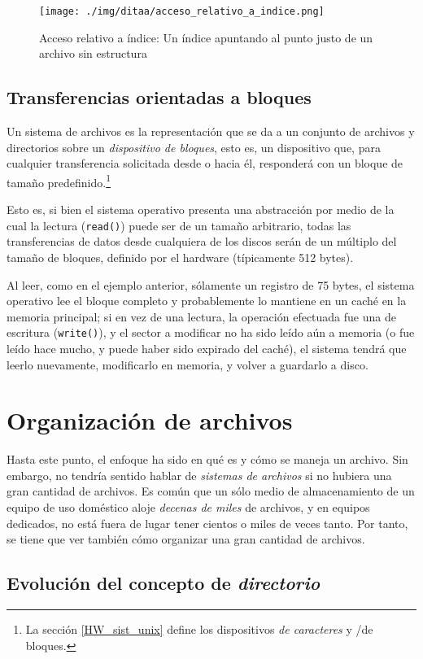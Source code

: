 \documentclass[11pt,fleqn]{book} %
\begin{document}
\begin{figure}[htb]
\centering
\texttt{[image: ./img/ditaa/acceso\_relativo\_a\_indice.png]}
\caption{\label{DIR_acceso_relativo_a_indice}Acceso relativo a índice: Un índice apuntando al punto justo de un archivo sin estructura}
\end{figure}
\subsection{Transferencias orientadas a bloques}
\label{sec-6-2-6}


Un sistema de archivos es la representación que se da a un conjunto de
archivos y directorios sobre un \emph{dispositivo de bloques}, esto es, un
dispositivo que, para cualquier transferencia solicitada desde o hacia
él, responderá con un bloque de tamaño predefinido.\footnote{La sección
\ref{HW_sist_unix} define los dispositivos \emph{de caracteres} y /de
bloques. }

Esto es, si bien el sistema operativo presenta una abstracción por
medio de la cual la lectura (\texttt{read()}) puede ser de un tamaño
arbitrario, todas las transferencias de datos desde cualquiera de los
discos serán de un múltiplo del tamaño de bloques, definido por el
hardware (típicamente 512 bytes).

Al leer, como en el ejemplo anterior, sólamente un registro
de 75 bytes, el sistema operativo lee el bloque completo y
probablemente lo mantiene en un caché en la memoria principal; si en
vez de una lectura, la operación efectuada fue una de escritura
(\texttt{write()}), y el sector a modificar no ha sido leído aún a
memoria (o fue leído hace mucho, y puede haber sido expirado del
caché), el sistema tendrá que leerlo nuevamente, modificarlo en
memoria, y volver a guardarlo a disco.
\section{Organización de archivos}
\label{sec-6-3}


Hasta este punto, el enfoque ha sido en qué es y cómo se maneja un
archivo. Sin embargo, no tendría sentido hablar de \emph{sistemas de archivos} si no hubiera una gran cantidad de archivos. Es común que un
sólo medio de almacenamiento de un equipo de uso doméstico aloje
\emph{decenas de miles} de archivos, y en equipos dedicados, no está fuera
de lugar tener cientos o miles de veces tanto. Por tanto, se tiene que
ver también cómo organizar una gran cantidad de archivos.
\subsection{Evolución del concepto de \emph{directorio}}
\label{sec-6-3-1}
\end{document}
